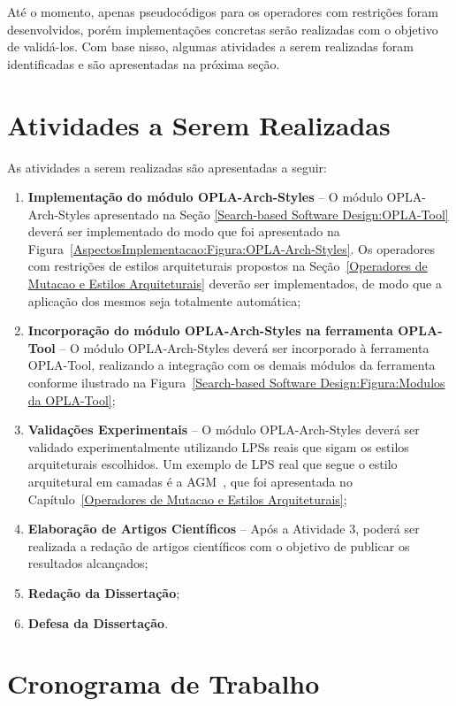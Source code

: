 Até o momento, apenas pseudocódigos para os operadores com restrições foram desenvolvidos, porém implementações concretas serão realizadas com o objetivo de validá-los. Com base nisso, algumas atividades a serem realizadas foram identificadas e são apresentadas na próxima seção.

\section{Atividades a Serem Realizadas}
\label{Proposta de Trabalho:Atividades a Serem Realizadas}

As atividades a serem realizadas são apresentadas a seguir:

\begin{enumerate}
	\item \textbf{Implementação do módulo OPLA-Arch-Styles} -- O módulo OPLA-Arch-Styles apresentado na Seção \ref{Search-based Software Design:OPLA-Tool} deverá ser implementado do modo que foi apresentado na Figura~\ref{AspectosImplementacao:Figura:OPLA-Arch-Styles}. Os operadores com restrições de estilos arquiteturais propostos na Seção~\ref{Operadores de Mutacao e Estilos Arquiteturais} deverão ser implementados, de modo que a aplicação dos mesmos seja totalmente automática;
	\item \textbf{Incorporação do módulo OPLA-Arch-Styles na ferramenta OPLA-Tool} -- O módulo OPLA-Arch-Styles deverá ser incorporado à ferramenta OPLA-Tool, realizando a integração com os demais módulos da ferramenta conforme ilustrado na Figura~\ref{Search-based Software Design:Figura:Modulos da OPLA-Tool};
	\item \textbf{Validações Experimentais} -- O módulo OPLA-Arch-Styles deverá ser validado experimentalmente utilizando LPSs reais que sigam os estilos arquiteturais escolhidos. Um exemplo de LPS real que segue o estilo arquitetural em camadas é a AGM~\cite{seiAGM}, que foi apresentada no Capítulo~\ref{Operadores de Mutacao e Estilos Arquiteturais};
	\item \textbf{Elaboração de Artigos Científicos} -- Após a Atividade 3, poderá ser realizada a redação de artigos científicos com o objetivo de publicar os resultados alcançados;
	\item \textbf{Redação da Dissertação};
	\item \textbf{Defesa da Dissertação}.
\end{enumerate}


\section{Cronograma de Trabalho}
\label{Proposta de Trabalho:Cronograma de Trabalho}

